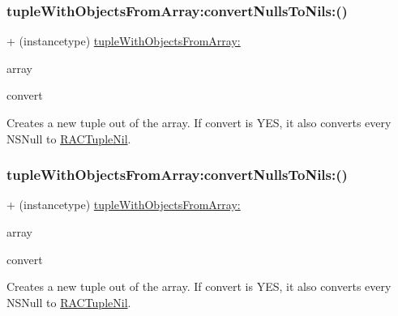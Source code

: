 \subsubsection{\texorpdfstring{tuple\+With\+Objects\+From\+Array\+:convert\+Nulls\+To\+Nils\+:()}{tupleWithObjectsFromArray:convertNullsToNils:()}\hspace{0.1cm}{\footnotesize\ttfamily [1/3]}}
{\footnotesize\ttfamily + (instancetype) \mbox{\hyperlink{interface_r_a_c_tuple_a3a1907a961d70cac573b0a4daea43834}{tuple\+With\+Objects\+From\+Array\+:}} \begin{DoxyParamCaption}\item[{(N\+S\+Array $\ast$)}]{array }\item[{convertNullsToNils:(B\+O\+OL)}]{convert }\end{DoxyParamCaption}}

Creates a new tuple out of the array. If {\ttfamily convert} is Y\+ES, it also converts every N\+S\+Null to \mbox{\hyperlink{interface_r_a_c_tuple_nil}{R\+A\+C\+Tuple\+Nil}}. \mbox{\label{interface_r_a_c_tuple_afe0710811403bf06fd2eda9062433109}} 
\subsubsection{\texorpdfstring{tuple\+With\+Objects\+From\+Array\+:convert\+Nulls\+To\+Nils\+:()}{tupleWithObjectsFromArray:convertNullsToNils:()}\hspace{0.1cm}{\footnotesize\ttfamily [2/3]}}
{\footnotesize\ttfamily + (instancetype) \mbox{\hyperlink{interface_r_a_c_tuple_a3a1907a961d70cac573b0a4daea43834}{tuple\+With\+Objects\+From\+Array\+:}} \begin{DoxyParamCaption}\item[{(N\+S\+Array $\ast$)}]{array }\item[{convertNullsToNils:(B\+O\+OL)}]{convert }\end{DoxyParamCaption}}

Creates a new tuple out of the array. If {\ttfamily convert} is Y\+ES, it also converts every N\+S\+Null to \mbox{\hyperlink{interface_r_a_c_tuple_nil}{R\+A\+C\+Tuple\+Nil}}. \mbox{\label{interface_r_a_c_tuple_afe0710811403bf06fd2eda9062433109}} 

